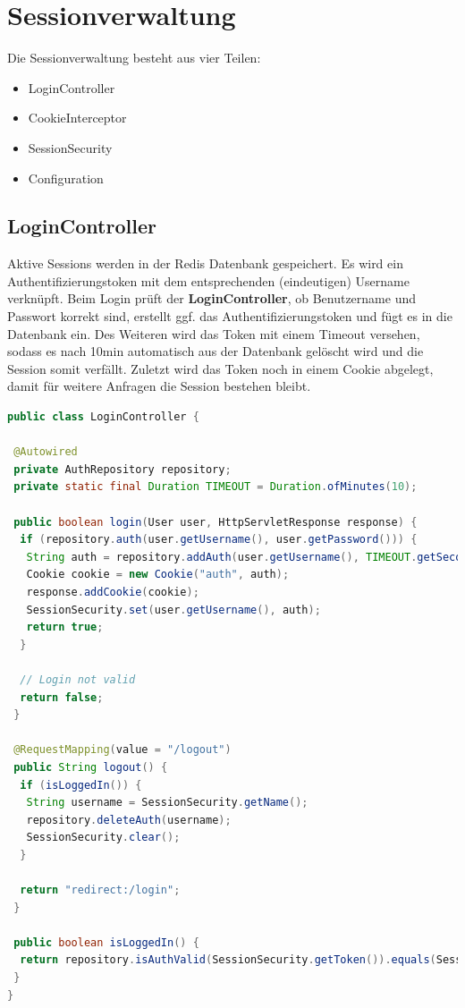 \documentclass[
    a4paper
]{scrreprt}
\begin{document}
    \section{Sessionverwaltung}
    Die Sessionverwaltung besteht aus vier Teilen:
    	\begin{itemize} 
    	\item LoginController
    	\item CookieInterceptor
    	\item SessionSecurity
    	\item Configuration
    \end{itemize}
\subsection{LoginController}
	Aktive Sessions werden in der Redis Datenbank gespeichert. Es wird ein Authentifizierungstoken mit dem entsprechenden (eindeutigen) Username verknüpft. Beim Login prüft der \textbf{LoginController}, ob Benutzername und Passwort korrekt sind, erstellt ggf. das Authentifizierungstoken und fügt es in die Datenbank ein. Des Weiteren wird das Token mit einem Timeout versehen, sodass es nach 10min automatisch aus der Datenbank gelöscht wird und die Session somit verfällt. Zuletzt wird das Token noch in einem Cookie abgelegt, damit für weitere Anfragen die Session bestehen bleibt.
	\begin{lstlisting}[language=java]
public class LoginController {
	
 @Autowired
 private AuthRepository repository;
 private static final Duration TIMEOUT = Duration.ofMinutes(10);

 public boolean login(User user, HttpServletResponse response) {
  if (repository.auth(user.getUsername(), user.getPassword())) {
   String auth = repository.addAuth(user.getUsername(), TIMEOUT.getSeconds(), TimeUnit.SECONDS);
   Cookie cookie = new Cookie("auth", auth);
   response.addCookie(cookie);
   SessionSecurity.set(user.getUsername(), auth);
   return true;
  }

  // Login not valid
  return false;
 }

 @RequestMapping(value = "/logout")
 public String logout() {
  if (isLoggedIn()) {
   String username = SessionSecurity.getName();
   repository.deleteAuth(username);
   SessionSecurity.clear();
  }

  return "redirect:/login";
 }

 public boolean isLoggedIn() {
  return repository.isAuthValid(SessionSecurity.getToken()).equals(SessionSecurity.getName());
 }
}
	\end{lstlisting}
	
\end{document}
